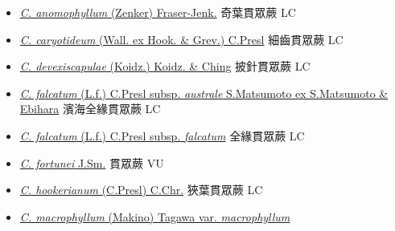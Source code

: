 \begin{itemize}
  \begin{itemize}
        \item[] \href{http://www.theplantlist.org/tpl1.1/search?q=Cyrtomium+anomophyllum}{\textit{C. anomophyllum} (Zenker) Fraser-Jenk.}   奇葉貫眾蕨   LC
        \item[] \href{http://www.theplantlist.org/tpl1.1/search?q=Cyrtomium+caryotideum}{\textit{C. caryotideum} (Wall. ex Hook. \& Grev.) C.Presl}   細齒貫眾蕨   LC
        \item[] \href{http://www.theplantlist.org/tpl1.1/search?q=Cyrtomium+devexiscapulae}{\textit{C. devexiscapulae} (Koidz.) Koidz. \& Ching}   披針貫眾蕨   LC
        \item[] \href{http://www.theplantlist.org/tpl1.1/search?q=Cyrtomium+falcatum+subsp.+australe}{\textit{C. falcatum} (L.f.) C.Presl subsp. \textit{australe} S.Matsumoto ex S.Matsumoto \& Ebihara}  
                                        濱海全緣貫眾蕨   LC
        \item[] \href{http://www.theplantlist.org/tpl1.1/search?q=Cyrtomium+falcatum+subsp.+falcatum}{\textit{C. falcatum} (L.f.) C.Presl subsp. \textit{falcatum}}  
                                        全緣貫眾蕨   LC
        \item[] \href{http://www.theplantlist.org/tpl1.1/search?q=Cyrtomium+fortunei}{\textit{C. fortunei} J.Sm.}   貫眾蕨   VU
        \item[] \href{http://www.theplantlist.org/tpl1.1/search?q=Cyrtomium+hookerianum}{\textit{C. hookerianum} (C.Presl) C.Chr.}   狹葉貫眾蕨   LC
        \item[] \href{http://www.theplantlist.org/tpl1.1/search?q=Cyrtomium+macrophyllum+var.+macrophyllum}{\textit{C. macrophyllum} (Makino) Tagawa var. \textit{macrophyllum}}  

\end{itemize}
\end{itemize}
